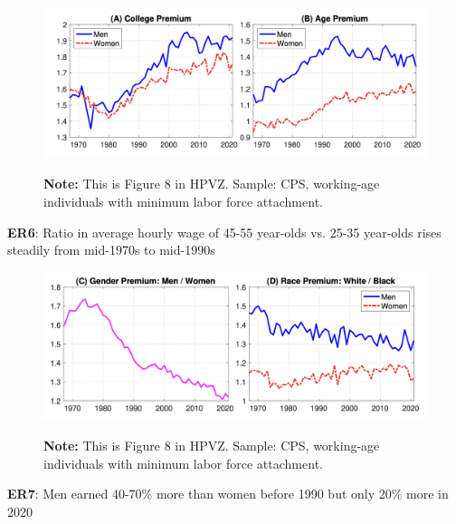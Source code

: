 \documentclass[11pt, aspectratio=169]{beamer}
\begin{document}
\begin{frame}{}
	\begin{figure}
		\includegraphics[scale=0.4]{./figures/inequality_wage_4}
	\vspace*{-2mm}
	\begin{flushleft}
		{\scriptsize \hspace{6mm} \textbf{Note:} This is Figure 8 in HPVZ. Sample: CPS, working-age individuals with minimum labor force attachment.}
	\end{flushleft}	
	\end{figure}

	\vspace{2mm}
	{\color{blue}\textbf{ER6}}: Ratio in average hourly wage of 45-55 year-olds vs. 25-35 year-olds rises steadily from mid-1970s to mid-1990s
\end{frame}


\begin{frame}{}
	\begin{figure}
		\includegraphics[scale=0.4]{./figures/inequality_wage_5}
	\vspace*{-2mm}
	\begin{flushleft}
		{\scriptsize \hspace{6mm} \textbf{Note:} This is Figure 8 in HPVZ. Sample: CPS, working-age individuals with minimum labor force attachment.}
	\end{flushleft}	
	\end{figure}

	\vspace{2mm}
	{\color{blue}\textbf{ER7}}: Men earned 40-70\% more than women before 1990 but only 20\% more in 2020
\end{frame}
\end{document}
